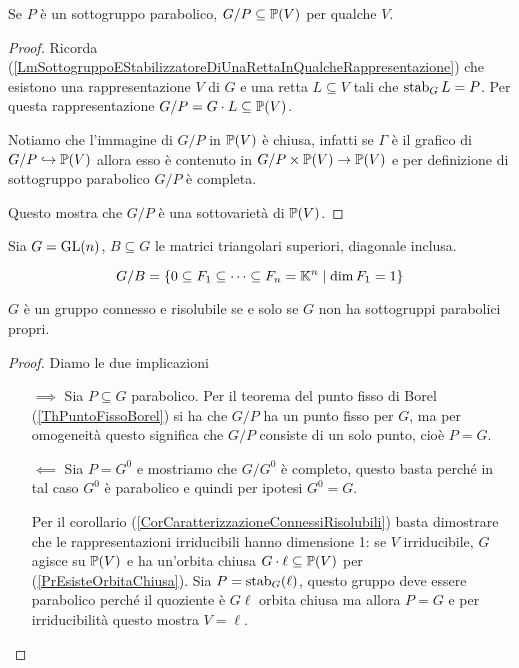 \begin{remark}
Se $P$ \`e un sottogruppo parabolico, $G/P\subseteq \mathbb{P}(V)$ per qualche $V$.
\end{remark}
\begin{proof}
Ricorda (\ref{LmSottogruppoEStabilizzatoreDiUnaRettaInQualcheRappresentazione}) che esistono una rappresentazione $V$ di $G$ e una retta $L\subseteq V$ tali che $\operatorname{stab}_G L=P$. Per questa rappresentazione $G/P=G\cdot L\subseteq \mathbb{P}(V)$.

Notiamo che l'immagine di $G/P$ in $\mathbb{P}(V)$ \`e chiusa, infatti se $\Gamma$ \`e il grafico di $G/P\hookrightarrow \mathbb{P}(V)$ allora esso \`e contenuto in $G/P \times \mathbb{P}(V)\to \mathbb{P}(V)$ e per definizione di sottogruppo parabolico $G/P$ \`e completa.

Questo mostra che $G/P$ \`e una sottovariet\`a di $\mathbb{P}(V)$.
\end{proof}

\begin{example}
Sia $G=\mathrm{GL}(n)$, $B\subseteq G$ le matrici triangolari superiori, diagonale inclusa.

\[G/B=\left\{{0\subseteq F_1\subseteq \cdots\subseteq F_n=\mathbb{K}^n\mid \dim F_1=1}\right\}\]
\end{example}

\begin{lemma}\label{LmConnessoRisolubileSSENoSottogruppiParabolici}
$G$ \`e un gruppo connesso e risolubile se e solo se $G$ non ha sottogruppi parabolici propri.
\end{lemma}
\begin{proof}
Diamo le due implicazioni
\setlength{\leftmargini}{0cm}
\begin{itemize}
\item[$\boxed{\implies}$] Sia $P\subseteq G$ parabolico. Per il teorema del punto fisso di Borel (\ref{ThPuntoFissoBorel}) si ha che $G/P$ ha un punto fisso per $G$, ma per omogeneit\`a questo significa che $G/P$ consiste di un solo punto, cio\`e $P=G$.
\item[$\boxed{\impliedby}$] Sia $P=G^0$ e mostriamo che $G/G^0$ \`e completo, questo basta perch\'e in tal caso $G^0$ \`e parabolico e quindi per ipotesi $G^0=G$.

Per il corollario (\ref{CorCaratterizzazioneConnessiRisolubili}) basta dimostrare che le rappresentazioni irriducibili hanno dimensione 1: se $V$ irriducibile, $G$ agisce su $\mathbb{P}(V)$ e ha un'orbita chiusa $G\cdot \ell\subseteq\mathbb{P}(V)$ per (\ref{PrEsisteOrbitaChiusa}). Sia $P=\operatorname{stab}_G(\ell)$, questo gruppo deve essere parabolico perch\'e il quoziente \`e $G\ell$ orbita chiusa ma allora $P=G$ e per irriducibilit\`a questo mostra $V=\ell$.
\end{itemize}
\setlength{\leftmargini}{0.5cm}
\end{proof}


